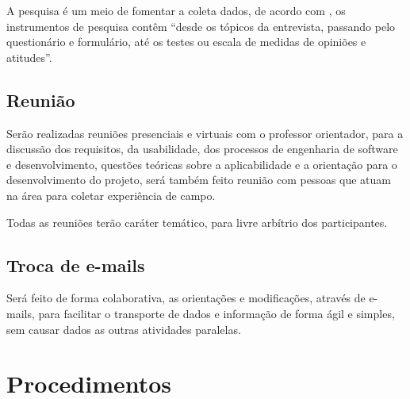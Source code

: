 



\par A pesquisa é um meio de fomentar a coleta dados, de acordo com
, os instrumentos de pesquisa contêm “desde os
tópicos da entrevista, passando pelo questionário e formulário, 
até os testes ou escala de medidas de opiniões e atitudes”.

\subsection{Reunião}

\par Serão realizadas reuniões presenciais e virtuais com o professor
orientador, para a discussão dos requisitos, da usabilidade, 
dos processos de engenharia de software e desenvolvimento, questões 
teóricas sobre a aplicabilidade e a orientação para o desenvolvimento do
projeto, será também feito reunião com pessoas que atuam na área para coletar
experiência de campo.

\par Todas as reuniões terão caráter temático, para livre arbítrio dos
participantes.

\subsection{Troca de e-mails}

\par Será feito de forma colaborativa, as orientações e modificações, através de
e-mails, para facilitar o transporte de dados e informação de forma ágil e
simples, sem causar dados as outras atividades paralelas.


\section{Procedimentos}

